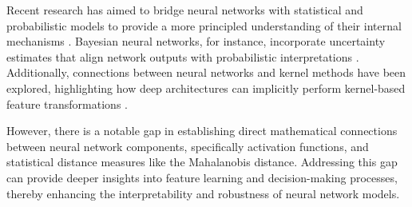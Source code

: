 Recent research has aimed to bridge neural networks with statistical and probabilistic models to provide a more principled understanding of their internal mechanisms \citep{bengio2013representation, goodfellow2016deep}. Bayesian neural networks, for instance, incorporate uncertainty estimates that align network outputs with probabilistic interpretations \citep{neal1996bayesian, blundell2015weight}. Additionally, connections between neural networks and kernel methods have been explored, highlighting how deep architectures can implicitly perform kernel-based feature transformations \citep{rahimi2008random}.

However, there is a notable gap in establishing direct mathematical connections between neural network components, specifically activation functions, and statistical distance measures like the Mahalanobis distance. Addressing this gap can provide deeper insights into feature learning and decision-making processes, thereby enhancing the interpretability and robustness of neural network models.
